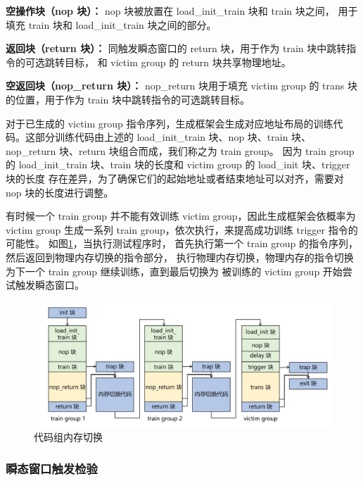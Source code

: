 \textbf{空操作块（nop 块）：}
nop 块被放置在 load\_init\_train 块和 train 块之间，
用于填充 train 块和 load\_init\_train 块之间的部分。\par

\textbf{返回块（return 块）：}
同触发瞬态窗口的 return 块，用于作为 train 块中跳转指令的可选跳转目标，
和 victim group 的 return 块共享物理地址。\par

\textbf{空返回块（nop\_return 块）：}
nop\_return 块用于填充 victim group 的 trans 块的位置，用于作为 train 块中跳转指令的可选跳转目标。\par

对于已生成的 victim group 指令序列，生成框架会生成对应地址布局的训练代码。这部分训练代码由上述的
load\_init\_train 块、nop 块、train 块、nop\_return 块、return 块组合而成，我们称之为 train group。
因为 train group 的 load\_init\_train 块、train 块的长度和 victim group 的 load\_init 块、trigger 块的长度
存在差异，为了确保它们的起始地址或者结束地址可以对齐，需要对 nop 块的长度进行调整。\par

有时候一个 train group 并不能有效训练 victim group，因此生成框架会依概率为 victim group
生成一系列 train group，依次执行，来提高成功训练 trigger 指令的可能性。
如图\ref{paper:memory-switch}，当执行测试程序时，
首先执行第一个 train group 的指令序列，然后返回到物理内存切换的指令部分，
执行物理内存切换，物理内存的指令切换为下一个 train group 继续训练，直到最后切换为
被训练的 victim group 开始尝试触发瞬态窗口。\par

\begin{figure}[!h]
    \centering
    \includegraphics[width=\linewidth]{figure/paper/group-switch.png}
    \caption{代码组内存切换}
    \label{paper:memory-switch}
\end{figure}

\subsubsection{瞬态窗口触发检验}

